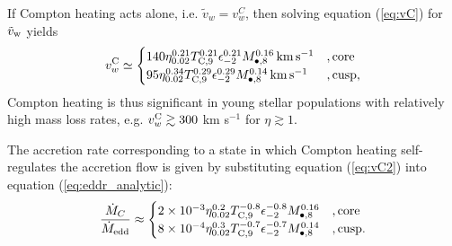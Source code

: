 \documentclass[usenatbib,fleqn]{mn2e}
\begin{document}
If Compton heating acts alone, i.e. $\tilde{v}_{w} = v_{w}^{C}$, then
solving equation (\ref{eq:vC}) for $\tilde{v}_{\rm w}$ yields
\begin{align} v_{w}^{\rm C} \simeq
  \begin{cases} 140 \eta_{0.02}^{0.21}T_{\rm
C,9}^{0.21}\epsilon_{-2}^{0.21} M_{\bullet,8}^{0.16}\,{\rm km\,s^{-1}}
&, \text{core}\\ 95 \eta_{0.02}^{0.34}T_{\rm
C,9}^{0.29}\epsilon_{-2}^{0.29} M_{\bullet,8}^{0.14}\,{\rm km\,s^{-1}}
&, \text{cusp},
  \end{cases}
  \label{eq:vC2}
\end{align} 
Compton heating is thus significant in young stellar populations
with relatively high mass loss rates, e.g. $v_{w}^{\rm C} \gtrsim 300$
km s$^{-1}$ for $\eta \gtrsim 1$.  

The accretion rate corresponding to a state in which Compton heating self-regulates the accretion flow is given by substituting equation (\ref{eq:vC2}) into equation (\ref{eq:eddr_analytic}):
\begin{align}
\frac{\dot{M}_{C}}{\dot{M}_{\rm edd}} \approx 
\begin{cases} 2\times 10^{-3} \eta_{0.02}^{0.2}T_{\rm
C,9}^{-0.8}\epsilon_{-2}^{-0.8} M_{\bullet,8}^{0.16}
&, \text{core}\\ 8\times 10^{-4} \eta_{0.02}^{0.3}T_{\rm
C,9}^{-0.7}\epsilon_{-2}^{-0.7} M_{\bullet,8}^{0.14}
&, \text{cusp}.
  \end{cases}
  \label{eq:MdotCa}
\end{align}
\end{document}
